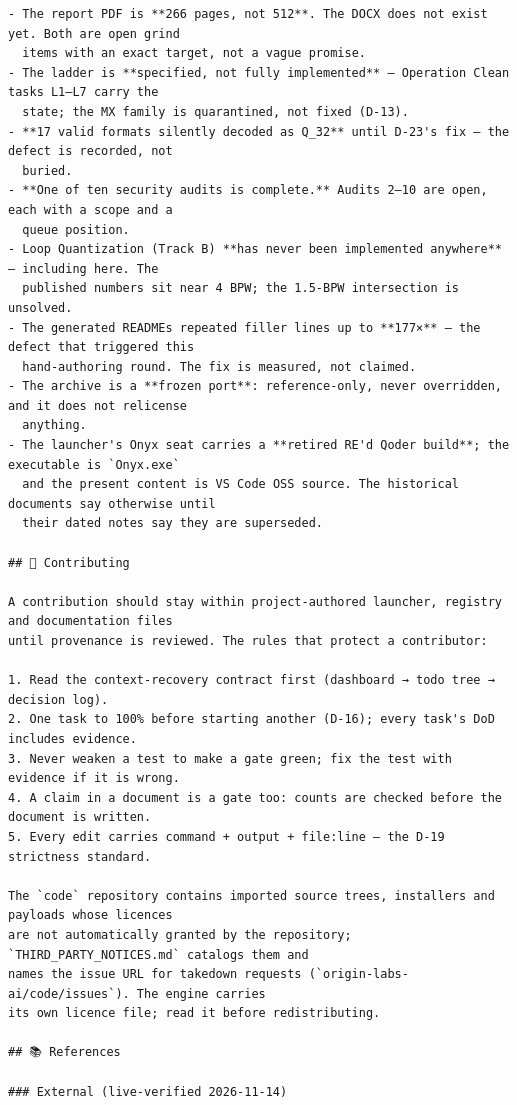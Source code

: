 \begin{Verbatim}[breaklines,breakanywhere,fontsize=\footnotesize]
- The report PDF is **266 pages, not 512**. The DOCX does not exist yet. Both are open grind
  items with an exact target, not a vague promise.
- The ladder is **specified, not fully implemented** — Operation Clean tasks L1–L7 carry the
  state; the MX family is quarantined, not fixed (D-13).
- **17 valid formats silently decoded as Q_32** until D-23's fix — the defect is recorded, not
  buried.
- **One of ten security audits is complete.** Audits 2–10 are open, each with a scope and a
  queue position.
- Loop Quantization (Track B) **has never been implemented anywhere** — including here. The
  published numbers sit near 4 BPW; the 1.5-BPW intersection is unsolved.
- The generated READMEs repeated filler lines up to **177×** — the defect that triggered this
  hand-authoring round. The fix is measured, not claimed.
- The archive is a **frozen port**: reference-only, never overridden, and it does not relicense
  anything.
- The launcher's Onyx seat carries a **retired RE'd Qoder build**; the executable is `Onyx.exe`
  and the present content is VS Code OSS source. The historical documents say otherwise until
  their dated notes say they are superseded.

## 🤝 Contributing

A contribution should stay within project-authored launcher, registry and documentation files
until provenance is reviewed. The rules that protect a contributor:

1. Read the context-recovery contract first (dashboard → todo tree → decision log).
2. One task to 100% before starting another (D-16); every task's DoD includes evidence.
3. Never weaken a test to make a gate green; fix the test with evidence if it is wrong.
4. A claim in a document is a gate too: counts are checked before the document is written.
5. Every edit carries command + output + file:line — the D-19 strictness standard.

The `code` repository contains imported source trees, installers and payloads whose licences
are not automatically granted by the repository; `THIRD_PARTY_NOTICES.md` catalogs them and
names the issue URL for takedown requests (`origin-labs-ai/code/issues`). The engine carries
its own licence file; read it before redistributing.

## 📚 References

### External (live-verified 2026-11-14)


\end{Verbatim}
